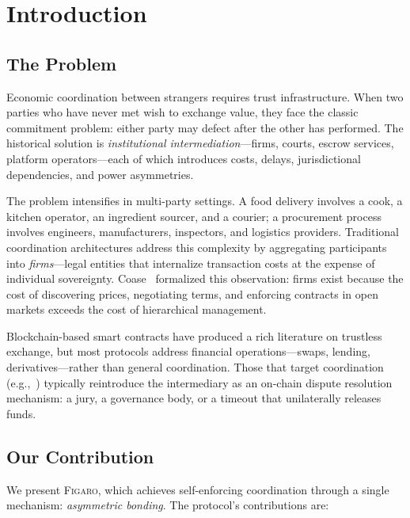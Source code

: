 \documentclass[11pt,a4paper]{article}
\theoremstyle{definition}
\theoremstyle{remark}
\newcommand{\figaro}{\textsc{Figaro}}
\begin{document}
\section{Introduction}
\label{sec:intro}

\subsection{The Problem}

Economic coordination between strangers requires trust infrastructure.
When two parties who have never met wish to exchange value, they face the
classic commitment problem: either party may defect after the other has
performed. The historical solution is \emph{institutional
intermediation}---firms, courts, escrow services, platform
operators---each of which introduces costs, delays, jurisdictional
dependencies, and power asymmetries.

The problem intensifies in multi-party settings. A food delivery involves
a cook, a kitchen operator, an ingredient sourcer, and a courier; a
procurement process involves engineers, manufacturers, inspectors, and
logistics providers. Traditional coordination architectures address this
complexity by aggregating participants into \emph{firms}---legal entities
that internalize transaction costs at the expense of individual
sovereignty. Coase~\citep{coase1937} formalized this observation:
firms exist because the cost of discovering prices, negotiating terms,
and enforcing contracts in open markets exceeds the cost of hierarchical
management.

Blockchain-based smart contracts have produced a rich literature on
trustless exchange, but most protocols address financial
operations---swaps, lending, derivatives---rather than general
coordination. Those that target coordination
(e.g.,~\citealt{kleros2019,aragon2017}) typically reintroduce the
intermediary as an on-chain dispute resolution mechanism: a jury, a
governance body, or a timeout that unilaterally releases funds.

\subsection{Our Contribution}

We present \figaro{}, which achieves self-enforcing coordination through
a single mechanism: \emph{asymmetric bonding}. The protocol's
contributions are:
\end{document}
